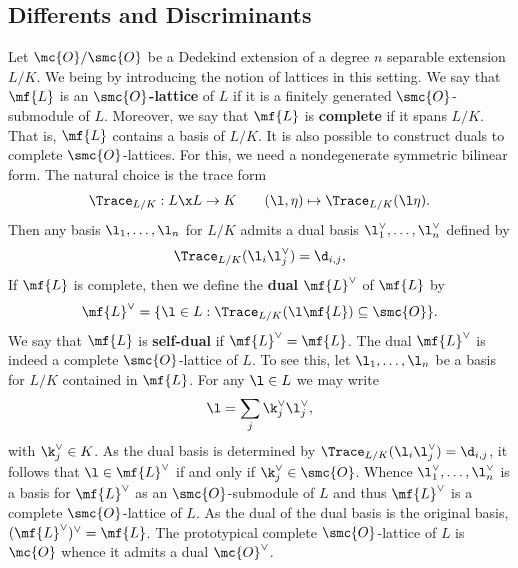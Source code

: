 \documentclass[12pt]{article}
\begin{document}
    \subsection{Differents and Discriminants}
      Let \(\mc{O}/\smc{O}\) be a Dedekind extension of a degree \(n\) separable extension \(L/K\). We being by introducing the notion of lattices in this setting. We say that \(\mf{L}\) is an \textbf{\(\smc{O}\)-lattice} of \(L\) if it is a finitely generated \(\smc{O}\)-submodule of \(L\). Moreover, we say that \(\mf{L}\) is \textbf{complete} if it spans \(L/K\). That is, \(\mf{L}\) contains a basis of \(L/K\). It is also possible to construct duals to complete \(\smc{O}\)-lattices. For this, we need a nondegenerate symmetric bilinear form. The natural choice is the trace form
      \[
        \Trace_{L/K}:L \x L \to K \qquad (\l,\eta) \mapsto \Trace_{L/K}(\l\eta).
      \]
      Then any basis \(\l_{1},\ldots,\l_{n}\) for \(L/K\) admits a dual basis \(\l_{1}^{\vee},\ldots,\l_{n}^{\vee}\) defined by
      \[
        \Trace_{L/K}(\l_{i}\l_{j}^{\vee}) = \d_{i,j},
      \]
      If \(\mf{L}\) is complete, then we define the \textbf{dual} \(\mf{L}^{\vee}\) of \(\mf{L}\) by
      \[
        \mf{L}^{\vee} = \{\l \in L:\Trace_{L/K}(\l\mf{L}) \subseteq \smc{O}\}.
      \]
      We say that \(\mf{L}\) is \textbf{self-dual} if \(\mf{L}^{\vee} = \mf{L}\). The dual \(\mf{L}^{\vee}\) is indeed a complete \(\smc{O}\)-lattice of \(L\). To see this, let \(\l_{1},\ldots,\l_{n}\) be a basis for \(L/K\) contained in \(\mf{L}\). For any \(\l \in L\) we may write
      \[
        \l = \sum_{j}\k_{j}^{\vee}\l_{j}^{\vee},
      \]
      with \(\k_{j}^{\vee} \in K\). As the dual basis is determined by \(\Trace_{L/K}(\l_{i}\l_{j}^{\vee}) = \d_{i,j}\), it follows that \(\l \in \mf{L}^{\vee}\) if and only if \(\k_{j}^{\vee} \in \smc{O}\). Whence \(\l_{1}^{\vee},\ldots,\l_{n}^{\vee}\) is a basis for \(\mf{L}^{\vee}\) as an \(\smc{O}\)-submodule of \(L\) and thus \(\mf{L}^{\vee}\) is a complete \(\smc{O}\)-lattice of \(L\). As the dual of the dual basis is the original basis, \((\mf{L}^{\vee})^{\vee} = \mf{L}\). The prototypical complete \(\smc{O}\)-lattice of \(L\) is \(\mc{O}\) whence it admits a dual \(\mc{O}^{\vee}\).
\end{document}
